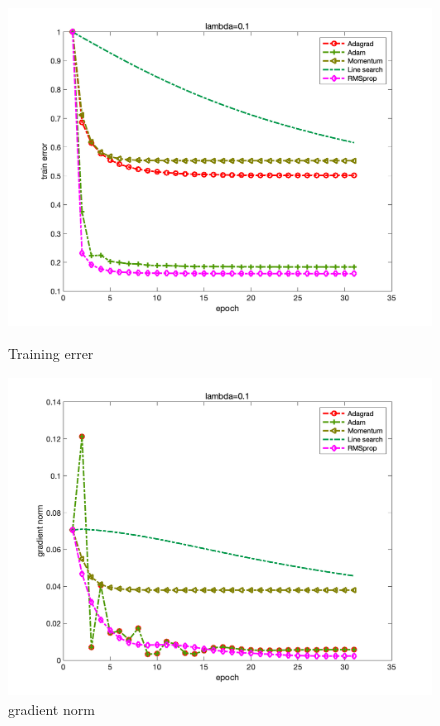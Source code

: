 \documentclass{article}
\begin{document}
\begin{figure}[H]
\begin{minipage}{0.33\linewidth}
	\centering
	\includegraphics[width=1\linewidth]{./fig/fval_g3}
	\caption{Training errer}
\end{minipage}
\begin{minipage}{0.33\linewidth}
	\centering
	\includegraphics[width=1\linewidth]{./fig/gnorm_g3}
	\caption{gradient norm}
\end{minipage}
\begin{minipage}{0.33\linewidth}
	\centering

\end{minipage}
\end{figure}
\end{document}
